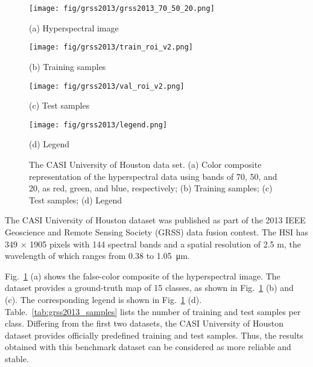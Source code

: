 \documentclass[journal]{IEEEtran}
\begin{document}
\begin{figure}[htb]
  \begin{minipage}[b]{\linewidth}
    \centering
    \texttt{[image: fig/grss2013/grss2013\_70\_50\_20.png]}
    \centerline{(a) Hyperspectral image}
  \end{minipage}
  \vfill
  \vspace{4pt}
  \begin{minipage}[b]{\linewidth}
    \centering
    \texttt{[image: fig/grss2013/train\_roi\_v2.png]}
    \centerline{(b) Training samples}
  \end{minipage}
  \vfill
  \vspace{4pt}
  \begin{minipage}[b]{\linewidth}
    \centering
    \texttt{[image: fig/grss2013/val\_roi\_v2.png]}
    \centerline{(c) Test samples}
  \end{minipage}
  \vfill
  \vspace{4pt}
  \begin{minipage}[b]{\linewidth}
    \centering
    \texttt{[image: fig/grss2013/legend.png]}
    \centerline{(d) Legend}
  \end{minipage}
  \caption{The CASI University of Houston data set. (a) Color composite representation of the hyperspectral data using bands of 70, 50, and 20, as red, green, and blue, respectively; (b) Training samples; (c) Test samples; (d) Legend}
  \label{fig:grss2013}
\end{figure}

The CASI University of Houston dataset was published as part of the 2013 IEEE Geoscience and Remote Sensing Society (GRSS) data fusion contest.
The HSI has 349 $\times$ 1905 pixels with 144 spectral bands and a spatial resolution of 2.5 m, the wavelength of which ranges from 0.38 to \SI{1.05}{\micro\metre}.

Fig.~\ref{fig:grss2013} (a) shows the false-color composite of the hyperspectral image.
The dataset provides a ground-truth map of 15 classes, as shown in Fig.~\ref{fig:grss2013} (b) and (c).
The corresponding legend is shown in Fig.~\ref{fig:grss2013} (d).
Table.~\ref{tab:grss2013_samples} lists the number of training and test samples per class.
Differing from the first two datasets, the CASI University of Houston dataset provides officially predefined training and test samples.
Thus, the results obtained with this benchmark dataset can be considered as more reliable and stable.
\end{document}
